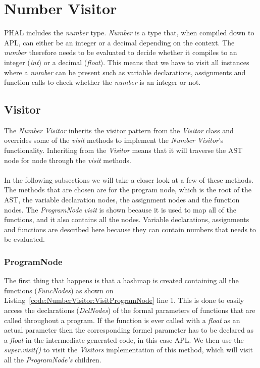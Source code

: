 \chapter{Number Visitor}
PHAL includes the \textit{number} type. \textit{Number} is a type that, when compiled down to APL, can either be an integer or a decimal depending on the context. The \textit{number} therefore needs to be evaluated to decide whether it compiles to an integer (\textit{int}) or a decimal (\textit{float}). This means that we have to visit all instances where a \textit{number} can be present such as variable declarations, assignments and function calls to check whether the \textit{number} is an integer or not.

\section{Visitor}
The \textit{Number Visitor} inherits the visitor pattern from the \textit{Visitor} class and overrides some of the \textit{visit} methods to implement the \textit{Number Visitor}'s functionality. Inheriting from the \textit{Visitor} means that it will traverse the AST node for node through the \textit{visit} methods.
\\\\
In the following subsections we will take a closer look at a few of these methods. The methods that are chosen are for the program node, which is the root of the AST, the variable declaration nodes, the assignment nodes and the function nodes. The \textit{ProgramNode} \textit{visit} is shown because it is used to map all of the functions, and it also contains all the nodes. Variable declarations, assignments and functions are described here because they can contain numbers that needs to be evaluated.

\subsection{ProgramNode}
The first thing that happens is that a hashmap is created containing all the functions (\textit{FuncNodes}) as shown on Listing~\ref{code:NumberVisitor:VisitProgramNode} line 1. This is done to easily access the declarations (\textit{DclNodes}) of the formal parameters of functions that are called throughout a program. 
If the function is ever called with a \textit{float} as an actual parameter then the corresponding formel parameter has to be declared as a \textit{float} in the intermediate generated code, in this case APL.
We then use the \textit{super.visit()} to visit the \textit{Visitors} implementation of this method, which will visit all the \textit{ProgramNode's} children. 

